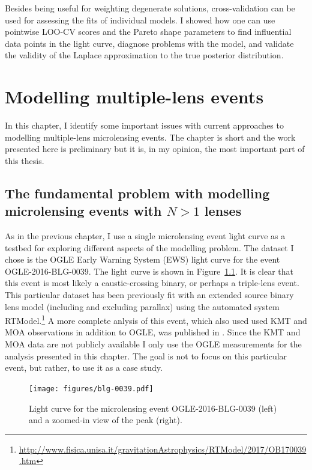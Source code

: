 \documentclass[12pt,dvipsnames]{report}
\begin{document}
Besides being useful for weighting degenerate solutions, cross-validation can be 
used for assessing the fits of individual models. I showed how one can use pointwise 
LOO-CV scores and the Pareto shape parameters to find influential data points in the 
light curve, diagnose problems with the model, and validate the validity of the Laplace approximation 
to the true posterior distribution.


\chapter{Modelling multiple-lens events}
\label{ch:multiple_lens_models}
In this chapter, I identify some important issues with current approaches to modelling 
multiple-lens microlensing events. The chapter is short and the work presented here 
is preliminary but it is, in my opinion, the most important part of this thesis.

\section{The fundamental problem with modelling microlensing events with $N>1$ lenses}
As in the previous chapter, I use a single microlensing event light curve
as a testbed for exploring different aspects of the modelling problem. 
The dataset I chose is the OGLE Early Warning System (EWS) light curve for the event
OGLE-2016-BLG-0039. The light curve is shown in Figure~\ref{fig:blg-0039}. 
It is clear that this event is most likely a caustic-crossing binary, or perhaps a 
triple-lens event. 
This particular dataset has been previously fit with 
an extended source binary lens model (including and excluding parallax) using the automated system 
RTModel.\footnote{\url{http://www.fisica.unisa.it/gravitationAstrophysics/RTModel/2017/OB170039.htm}}
A more complete anlysis of this event, which also used   used KMT and MOA observations in addition to OGLE,
was published in \citet{2018ApJ...867..136H}. 
Since the KMT and MOA data are not publicly available I only use the OGLE measurements for 
the analysis presented in this chapter. 
The goal is not to focus on this particular event, but rather, to use it as a case study.

\begin{figure}[!t]
    \begin{centering}
        \texttt{[image: figures/blg-0039.pdf]}
        \caption{
            Light curve for the microlensing event OGLE-2016-BLG-0039 (left) and a 
            zoomed-in view of the peak (right). 
        }
            \label{fig:blg-0039}
    \end{centering}
\end{figure}
\end{document}

